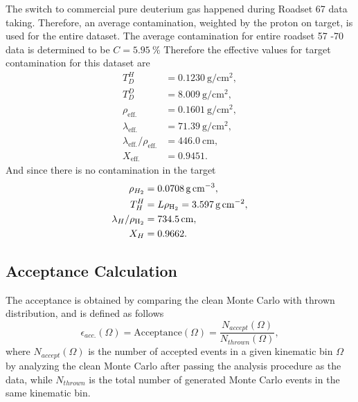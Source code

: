 \documentclass[../main.tex]{subfiles}
\begin{document}
The switch to commercial pure deuterium gas happened during Roadset 67 data taking. Therefore,
an average contamination, weighted by the proton on target, is used for the entire dataset.
The average contamination for entire roadset 57 -70 data is determined to be $C=\SI{5.95}{\percent}$
Therefore the effective values for target contamination for this dataset are
\begin{equation}
	\begin{split}
		T_D^H &= \SI{0.1230}{\g\per\cm\squared}, \\
		T_D^D &= \SI{8.009}{\g\per\cm\squared},\\
		\rho_{\mathrm{eff.}} & = \SI{0.1601}{\g\per\cm\squared},\\
		\lambda_{\mathrm{eff.}} &= \SI{71.39}{\g\per\cm\squared},\\
		\lambda_{\mathrm{eff.}}/\rho_{\mathrm{eff.}} &= \SI{446.0}{\cm},\\
		X_{\mathrm{eff.}} &= 0.9451.
	\end{split}
\end{equation}
And since there is no contamination in the  target
\begin{equation}
	\begin{split}
		\rho_{H_2} &= \SI{0.0708}{\g\per\cm\cubed},\\
		T_H^H &= L\rho_{\ce{H_2}} = \SI{3.597}{\g\per\cm\squared},\\
		\lambda_H/\rho_{\ce{H_2}} &= \SI{734.5}{\cm},\\
		X_H &=0.9662.
	\end{split}
\end{equation}


\subsection{Acceptance Calculation}
The acceptance is obtained by comparing the clean Monte Carlo with thrown distribution,
and is defined as follows
\begin{equation}
	\epsilon_{acc.}\left(\Omega\right)=\mathrm{Acceptance}\left(\Omega\right)= \frac{N_{accept}\left(\Omega\right)}{N_{thrown}\left(\Omega\right)},
\end{equation}
where $N_{accept}\left(\Omega\right)$ is the number of accepted events in a given kinematic bin $\Omega$
by analyzing the clean Monte Carlo after passing the analysis procedure as the data, while $N_{thrown}$ is
the total number of generated Monte Carlo events in the same kinematic bin.
\end{document}
